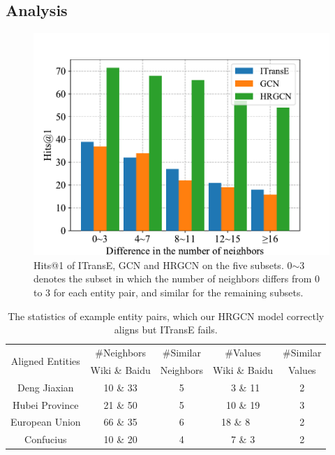 	\subsection{Analysis}
	\begin{figure}
		\begin{center}
			\includegraphics[width=1\linewidth]{figures/graph4.pdf}
			\caption{Hits@1 of ITransE, GCN and HRGCN on the five subsets. 0$\sim$3 denotes the subset in which the number of neighbors differs from 0 to 3 for each entity pair, and similar for the remaining subsets.}
			\label{subset}
		\end{center}
	\end{figure}
	\begin{table}
		\centering
		\small
		\begin{tabular}{ccccc}
			\toprule
			\multirow{2}{*}{Aligned Entities} & \#Neighbors & \#Similar & \#Values & \#Similar \\
			& Wiki \& Baidu & Neighbors & Wiki \& Baidu & Values \\
			\midrule
			Deng Jiaxian & 10 \& 33 & 5 & \ 3 \& 11 & 2\\
			Hubei Province & 21 \& 50 & 5 & 10 \& 19 & 3\\
			European Union & 66 \& 35 & 6 & 18 \& 8\ \ \ & 2\\
			Confucius & 10 \& 20 & 4 & 7 \& 3 & 2\\
			\bottomrule
		\end{tabular}
		\caption{The statistics of example entity pairs, which our HRGCN model correctly aligns but ITransE fails.}
		\label{example}
	\end{table}
	
